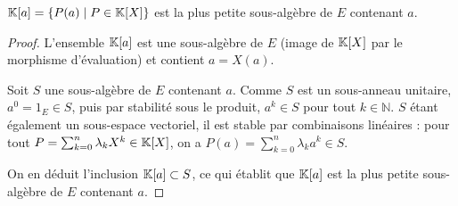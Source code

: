 \documentclass[11pt,a4paper]{report}
\begin{document}
\begin{property}
    $\mathbb{K}[a] = \{P(a) \mid P \in \mathbb{K}[X]\}$ est la plus petite sous-algèbre de $E$ contenant $a$.
\end{property}

\begin{proof}
    L'ensemble $\mathbb{K}[a]$ est une sous-algèbre de $E$ (image de $\mathbb{K}[X]$ par le morphisme d'évaluation) et contient $a = X(a)$.

    Soit $S$ une sous-algèbre de $E$ contenant $a$. Comme $S$ est un sous-anneau unitaire, $a^0 = 1_E \in S$, puis par stabilité sous le produit, $a^k \in S$ pour tout $k \in \mathbb{N}$. $S$ étant également un sous-espace vectoriel, il est stable par combinaisons linéaires : pour tout $P = \sum_{k=0}^n \lambda_k X^k \in \mathbb{K}[X]$, on a $P(a) = \sum_{k=0}^n \lambda_k a^k \in S$. 

    On en déduit l'inclusion $\mathbb{K}[a] \subset S$, ce qui établit que $\mathbb{K}[a]$ est la plus petite sous-algèbre de $E$ contenant $a$.
\end{proof}
\end{document}
